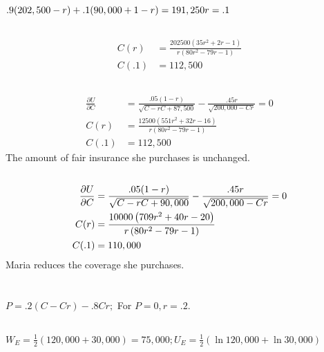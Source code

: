 \documentclass{article}
\begin{document}
	\subsection[h]{}
		$.9(202,500 - r) + .1(90,000+1-r)=191,250 \\
		r= .1$
	\subsection[i]{}
		\begin{align*}
			C(r)&=\frac{202500 \left(35 r^2+2 r-1\right)}{r \left(80 r^2-79 r-1\right)}	 \\
			C(.1) &= 112,500
		\end{align*}
	\subsection[j]{}
		\setcounter{equation}{0}
		\begin{align}
			\frac{\partial U}{\partial C} &= \frac{.05(1-r)}{\sqrt{C-rC+87,500}} - \frac{.45r}{\sqrt{200,000-Cr}} = 0 \\
			C(r) &=\frac{12500 \left(551 r^2+32 r-16\right)}{r \left(80 r^2-79 r-1\right)} \\
			C(.1) &= 112,500
		\end{align}
		The amount of fair insurance she purchases is unchanged. 
	\subsection[k]{}
		\begin{align}
		\setcounter{equation}{0}
			\frac{\partial U}{\partial C} &= \frac{.05(1-r)}{\sqrt{C-rC+90,000}} - \frac{.45r}{\sqrt{200,000-Cr}} = 0 \\
			C(r) &=\frac{10000 \left(709 r^2+40 r-20\right)}{r \left(80 r^2-79 r-1\right)} \\
			C(.1) &= 110,000
		\end{align}
		Maria reduces the coverage she purchases. 
\section[5]{}
	\subsection[a]{}
		$ P = .2(C-Cr)-.8Cr; $ For $P=0, r=.2.$
	\subsection[b]{}
		$ W_E = \frac{1}{2}(120,000+30,000) = 75,000; U_E = \frac{1}{2} (\ln 120,000 + \ln 30,000)$
\end{document}
